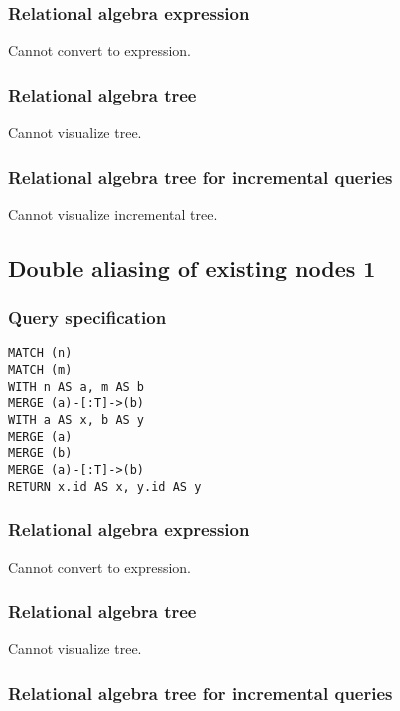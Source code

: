 \subsubsection*{Relational algebra expression}

Cannot convert to expression.

\subsubsection*{Relational algebra tree}

Cannot visualize tree.

\subsubsection*{Relational algebra tree for incremental queries}

Cannot visualize incremental tree.

\subsection{Double aliasing of existing nodes 1}

\subsubsection*{Query specification}

\begin{lstlisting}
MATCH (n)
MATCH (m)
WITH n AS a, m AS b
MERGE (a)-[:T]->(b)
WITH a AS x, b AS y
MERGE (a)
MERGE (b)
MERGE (a)-[:T]->(b)
RETURN x.id AS x, y.id AS y
\end{lstlisting}

\subsubsection*{Relational algebra expression}

Cannot convert to expression.

\subsubsection*{Relational algebra tree}

Cannot visualize tree.

\subsubsection*{Relational algebra tree for incremental queries}

